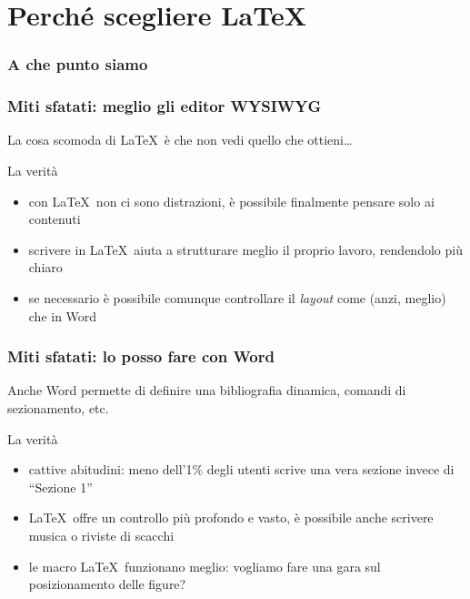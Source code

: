 \documentclass[svgnames,%
	ucs,%
	pdftex]{guitbeamer}
\begin{document}
\section{Perch\'e scegliere \LaTeX}
\begin{frame}
  \frametitle{A che punto siamo}
\end{frame}
\begin{frame}
  \frametitle{Miti sfatati: meglio gli editor WYSIWYG}
	La cosa scomoda di \LaTeX\ \`e che non vedi quello che ottieni\dots
  \medskip
	\begin{block}{La verit\`a}
		\begin{itemize}
			\item con \LaTeX\ non ci sono distrazioni, \`e possibile finalmente pensare solo ai contenuti
			\item scrivere in \LaTeX\ aiuta a strutturare meglio il proprio lavoro, rendendolo pi\`u chiaro
			\item se necessario \`e possibile comunque controllare il \textit{layout} come (anzi, meglio) che in Word
		\end{itemize}
	\end{block}
\end{frame}
\begin{frame}
  \frametitle{Miti sfatati: lo posso fare con Word}
	Anche Word permette di definire una bibliografia dinamica, comandi di sezionamento, etc.
  \medskip
	\begin{block}{La verit\`a}
		\begin{itemize}
			\item cattive abitudini: meno dell'1\% degli utenti scrive una vera sezione invece di ``Sezione 1''
			\item \LaTeX\ offre un controllo pi\`u profondo e vasto, \`e possibile anche scrivere musica o riviste di scacchi
			\item le macro \LaTeX\ funzionano meglio: vogliamo fare una gara sul posizionamento delle figure?
		\end{itemize}
	\end{block}
\end{frame}
\end{document}
